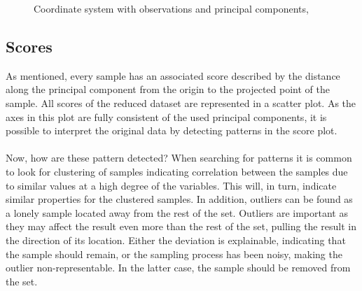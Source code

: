 \begin{figure}[H]
\begin{minipage}{\wd\FigBox}
    \centering\usebox{\FigBox}
  \end{minipage}
  \begin{minipage}{\wd\FigBox}
    \centering\usebox{\FigBox}
  \end{minipage}\hspace*{\FigHSkip}
  \caption[Principal Component Analysis]{Coordinate system with observations and principal components, \cite{pid}}
  \label{fig:pca1}
\end{figure}


\subsection{Scores}
As mentioned, every sample has an associated score described by the distance along the principal component from the origin to the projected point of the sample. All scores of the reduced dataset are represented in a scatter plot. As the axes in this plot are fully consistent of the used principal components, it is possible to interpret the original data by detecting patterns in the score plot. 
\\\\
Now, how are these pattern detected? When searching for patterns it is common to look for clustering of samples indicating correlation between the samples due to similar values at a high degree of the variables. This will, in turn, indicate similar properties for the clustered samples. In addition, outliers can be found as a lonely sample located away from the rest of the set. Outliers are important as they may affect the result even more than the rest of the set, pulling the result in the direction of its location. Either the deviation is explainable, indicating that the sample should remain, or the sampling process has been noisy, making the outlier non-representable. In the latter case, the sample should be removed from the set. 

